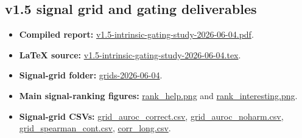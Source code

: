 \documentclass[11pt]{article}
\begin{document}
\subsection{v1.5 signal grid and gating deliverables}
\begin{itemize}
\item \textbf{Compiled report:}
\href{https://github.com/BDeMo/research-notes/blob/main/notes/plans/08-model-outputs-delta-w/v1.5-intrinsic-gating-study-2026-06-04.pdf}{v1.5-intrinsic-gating-study-2026-06-04.pdf}.
\item \textbf{LaTeX source:}
\href{https://github.com/BDeMo/research-notes/blob/main/notes/plans/08-model-outputs-delta-w/v1.5-intrinsic-gating-study-2026-06-04.tex}{v1.5-intrinsic-gating-study-2026-06-04.tex}.
\item \textbf{Signal-grid folder:}
\href{https://github.com/BDeMo/research-notes/tree/main/notes/plans/08-model-outputs-delta-w/grids-2026-06-04}{grids-2026-06-04}.
\item \textbf{Main signal-ranking figures:}
\href{https://github.com/BDeMo/research-notes/blob/main/notes/plans/08-model-outputs-delta-w/grids-2026-06-04/rank_help.png}{rank\_help.png}
and
\href{https://github.com/BDeMo/research-notes/blob/main/notes/plans/08-model-outputs-delta-w/grids-2026-06-04/rank_interesting.png}{rank\_interesting.png}.
\item \textbf{Signal-grid CSVs:}
\href{https://github.com/BDeMo/research-notes/blob/main/notes/plans/08-model-outputs-delta-w/grids-2026-06-04/grid_auroc_correct.csv}{grid\_auroc\_correct.csv},
\href{https://github.com/BDeMo/research-notes/blob/main/notes/plans/08-model-outputs-delta-w/grids-2026-06-04/grid_auroc_noharm.csv}{grid\_auroc\_noharm.csv},
\href{https://github.com/BDeMo/research-notes/blob/main/notes/plans/08-model-outputs-delta-w/grids-2026-06-04/grid_spearman_cont.csv}{grid\_spearman\_cont.csv},
\href{https://github.com/BDeMo/research-notes/blob/main/notes/plans/08-model-outputs-delta-w/grids-2026-06-04/corr_long.csv}{corr\_long.csv}.
\end{itemize}
\end{document}
